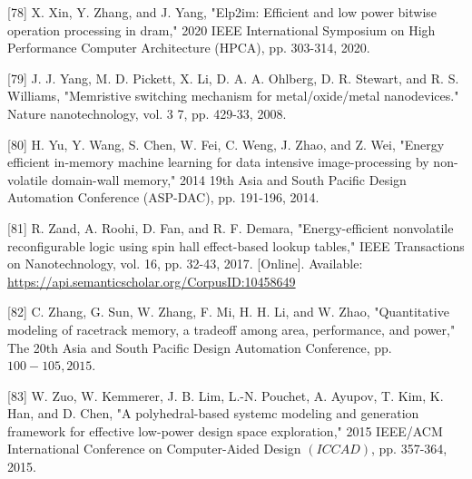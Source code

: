 \documentclass[10pt]{article}
\begin{document}
[78] X. Xin, Y. Zhang, and J. Yang, "Elp2im: Efficient and low power bitwise operation processing in dram," 2020 IEEE International Symposium on High Performance Computer Architecture (HPCA), pp. 303-314, 2020.

[79] J. J. Yang, M. D. Pickett, X. Li, D. A. A. Ohlberg, D. R. Stewart, and R. S. Williams, "Memristive switching mechanism for metal/oxide/metal nanodevices." Nature nanotechnology, vol. 3 7, pp. 429-33, 2008.

[80] H. Yu, Y. Wang, S. Chen, W. Fei, C. Weng, J. Zhao, and Z. Wei, "Energy efficient in-memory machine learning for data intensive image-processing by non-volatile domain-wall memory," 2014 19th Asia and South Pacific Design Automation Conference (ASP-DAC), pp. 191-196, 2014.

[81] R. Zand, A. Roohi, D. Fan, and R. F. Demara, "Energy-efficient nonvolatile reconfigurable logic using spin hall effect-based lookup tables," IEEE Transactions on Nanotechnology, vol. 16, pp. 32-43, 2017. [Online]. Available: \href{https://api.semanticscholar.org/CorpusID:10458649}{https://api.semanticscholar.org/CorpusID:10458649}

[82] C. Zhang, G. Sun, W. Zhang, F. Mi, H. H. Li, and W. Zhao, "Quantitative modeling of racetrack memory, a tradeoff among area, performance, and power," The 20th Asia and South Pacific Design Automation Conference, pp. $100-105,2015$.

[83] W. Zuo, W. Kemmerer, J. B. Lim, L.-N. Pouchet, A. Ayupov, T. Kim, K. Han, and D. Chen, "A polyhedral-based systemc modeling and generation framework for effective low-power design space exploration," 2015 IEEE/ACM International Conference on Computer-Aided Design $(I C C A D)$, pp. 357-364, 2015.
\end{document}
